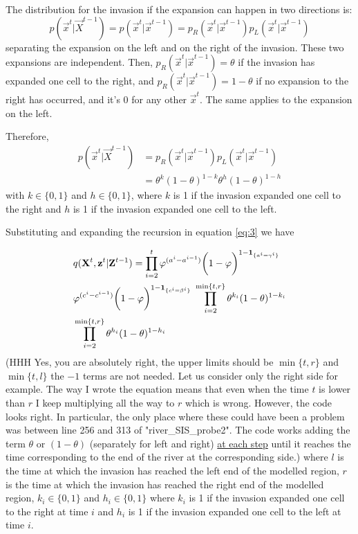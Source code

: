 The distribution for the invasion if the expansion can happen in two directions is:
\begin{equation*}
    p(\vec{x}^{t} | \vec{X}^{t-1}) = p(\vec{x}^{t} | \vec{x}^{t-1}) = p_R(\vec{x}^{t} | \vec{x}^{t-1}) p_L(\vec{x}^{t} | \vec{x}^{t-1}) 
\end{equation*}
separating the expansion on the left and on the right of the invasion.
These two expansions are independent. Then, $p_R(\vec{x}^{t} | \vec{x}^{t-1}) = \theta$ if the invasion has expanded one cell to the right, and $p_R(\vec{x}^{t} | \vec{x}^{t-1}) = 1 - \theta$ if no expansion to the right has occurred, and it's 0 for any other $\vec{x}^{t}$. The same applies to the expansion on the left.

Therefore,
\begin{align*}
    p(\vec{x}^{t} | \vec{X}^{t-1}) &= p_R(\vec{x}^{t} | \vec{x}^{t-1}) p_L(\vec{x}^{t} | \vec{x}^{t-1})\\
    & = \theta^{k} (1-\theta)^{1-k}\theta^{h} (1-\theta)^{1-h} 
\end{align*}
with $k \in \{0,1\}$ and $h \in \{0,1\}$, {\color{blue} where $k$ is 1 if the invasion expanded one cell to the right and $h$ is 1 if the invasion expanded one cell to the left.}

Substituting and expanding the recursion in equation \eqref{eq:3} we have

\begin{align}
    & q(\mathbf{X}^{t},\mathbf{z}^{t} | \mathbf{Z}^{t-1}) =  \prod_{i=2}^{t} \varphi^{(a^{i} - a^{i-1})}\bigg(1 - \varphi \bigg)^{1-\mathbf{1}_{\{a^i=\gamma^i\}}} \nonumber \\
    & \varphi^{(c^{i} - c^{i-1})} \bigg(1 - \varphi\bigg)^{1-\mathbf{1}_{\{c^i=\beta^i\}}} \; \prod_{i=2}^{\min\{t,r\}} \theta^{k_i} (1-\theta)^{1-k_i}  \label{eq:4} \\ 
    & \prod_{i=2}^{\min\{t,r\}} \theta^{h_i} (1-\theta)^{1-h_i} \nonumber
\end{align}
{\color{blue}(HHH Yes, you are absolutely right, the upper limits should be $\min\{t,r\}$ and $\min\{t,l\}$ the $-1$ terms are not needed. Let us consider only the right side for example. The way I wrote the equation means that even when the time $t$ is lower than $r$ I keep multiplying all the way to $r$ which is wrong. However, the code looks right. In particular, the only place where these could have been a problem was between line 256 and 313 of "river\_SIS\_probe2". The code works adding the term $\theta$ or $(1-\theta)$ (separately for left and right) \underline{at each step} until it reaches the time corresponding to the end of the river at the corresponding side.)}
where $l$ is the time at which the invasion has reached the left end of the modelled region, $r$ is the time at which the invasion has reached the right end of the modelled region, {\color{blue} $k_i \in \{0,1\}$ and $h_i \in \{0,1\}$ where $k_i$ is 1 if the invasion expanded one cell to the right at time $i$ and $h_i$ is 1 if the invasion expanded one cell to the left at time $i$}.

